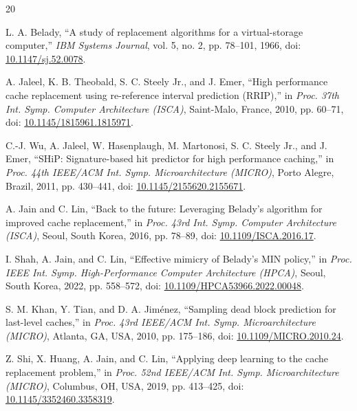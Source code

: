 \documentclass[conference]{IEEEtran}
\begin{document}
\begin{thebibliography}{20}
\setlength{\itemsep}{-0.2ex}

L. A. Belady,
``A study of replacement algorithms for a virtual-storage computer,''
\textit{IBM Systems Journal}, vol. 5, no. 2, pp. 78--101, 1966,
doi: \href{https://doi.org/10.1147/sj.52.0078}{10.1147/sj.52.0078}.

A. Jaleel, K. B. Theobald, S. C. Steely Jr., and J. Emer,
``High performance cache replacement using re-reference interval prediction (RRIP),''
in \textit{Proc. 37th Int. Symp. Computer Architecture (ISCA)},
Saint-Malo, France, 2010, pp. 60--71,
doi: \href{https://doi.org/10.1145/1815961.1815971}{10.1145/1815961.1815971}.

C.-J. Wu, A. Jaleel, W. Hasenplaugh, M. Martonosi, S. C. Steely Jr., and J. Emer,
``SHiP: Signature-based hit predictor for high performance caching,''
in \textit{Proc. 44th IEEE/ACM Int. Symp. Microarchitecture (MICRO)},
Porto Alegre, Brazil, 2011, pp. 430--441,
doi: \href{https://doi.org/10.1145/2155620.2155671}{10.1145/2155620.2155671}.

A. Jain and C. Lin,
``Back to the future: Leveraging Belady's algorithm for improved cache replacement,''
in \textit{Proc. 43rd Int. Symp. Computer Architecture (ISCA)},
Seoul, South Korea, 2016, pp. 78--89,
doi: \href{https://doi.org/10.1109/ISCA.2016.17}{10.1109/ISCA.2016.17}.

I. Shah, A. Jain, and C. Lin,
``Effective mimicry of Belady's MIN policy,''
in \textit{Proc. IEEE Int. Symp. High-Performance Computer Architecture (HPCA)},
Seoul, South Korea, 2022, pp. 558--572,
doi: \href{https://doi.org/10.1109/HPCA53966.2022.00048}{10.1109/HPCA53966.2022.00048}.

S. M. Khan, Y. Tian, and D. A. Jiménez,
``Sampling dead block prediction for last-level caches,''
in \textit{Proc. 43rd IEEE/ACM Int. Symp. Microarchitecture (MICRO)},
Atlanta, GA, USA, 2010, pp. 175--186,
doi: \href{https://doi.org/10.1109/MICRO.2010.24}{10.1109/MICRO.2010.24}.

Z. Shi, X. Huang, A. Jain, and C. Lin,
``Applying deep learning to the cache replacement problem,''
in \textit{Proc. 52nd IEEE/ACM Int. Symp. Microarchitecture (MICRO)},
Columbus, OH, USA, 2019, pp. 413--425,
doi: \href{https://doi.org/10.1145/3352460.3358319}{10.1145/3352460.3358319}.


\end{thebibliography}
\end{document}
